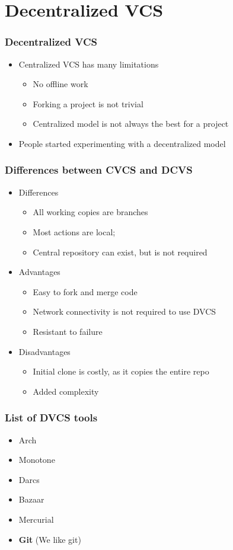 \documentclass{beamer}
\begin{document}
\section{Decentralized VCS}

\begin{frame}
    \frametitle{Decentralized VCS}
    \begin{itemize}
	\item Centralized VCS has many limitations
	\begin{itemize}
	    \item No offline work
	    \item Forking a project is not trivial
	    \item Centralized model is not always the best for a project
	\end{itemize}
	\item People started experimenting with a decentralized model
    \end{itemize}
\end{frame}

\begin{frame}
    \frametitle{Differences between CVCS and DCVS}
    \begin{itemize}
	\item Differences
	\begin{itemize}
	    \item All working copies are branches
	    \item Most actions are local;
	    \item Central repository can exist, but is not required
	\end{itemize}
	\item Advantages
	\begin{itemize}
	    \item Easy to fork and merge code
	    \item Network connectivity is not required to use DVCS
	    \item Resistant to failure
	\end{itemize}
	\item Disadvantages
	\begin{itemize}
	    \item Initial clone is costly, as it copies the entire repo
	    \item Added complexity 
	\end{itemize}
    \end{itemize}
\end{frame}

\begin{frame}
    \frametitle{List of DVCS tools}
    \begin{itemize}
	\item Arch
	\item Monotone
	\item Darcs
	\item Bazaar
	\item Mercurial
	\item {\bf Git} (We like git)
    \end{itemize}
\end{frame}
\end{document}
